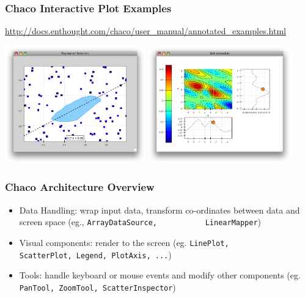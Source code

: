 \documentclass[14pt,compress]{beamer}
\newcommand{\typ}[1]{\lstinline{#1}}
\begin{document}
\begin{frame}
  \frametitle{Chaco Interactive Plot Examples}
\scriptsize
\url{http://docs.enthought.com/chaco/user_manual/annotated_examples.html}
\begin{center}
    \includegraphics[height=2in, interpolate=true]{images/chaco_regr}
    \includegraphics[height=2in, interpolate=true]{images/chaco_cmapi}
\end{center}
\end{frame}


\begin{frame}
  \frametitle{Chaco Architecture Overview}
  \begin{itemize}

      \item Data Handling: wrap input data, transform co-ordinates
          between data and screen space (eg., \typ{ArrayDataSource,
          LinearMapper})

      \item Visual components: render to the screen (eg. \typ{LinePlot,
          ScatterPlot, Legend, PlotAxis, ...})

      \item Tools: handle keyboard or mouse events and modify other
          components (eg. \typ{PanTool, ZoomTool, ScatterInspector})

  \end{itemize}
\end{frame}
\end{document}
